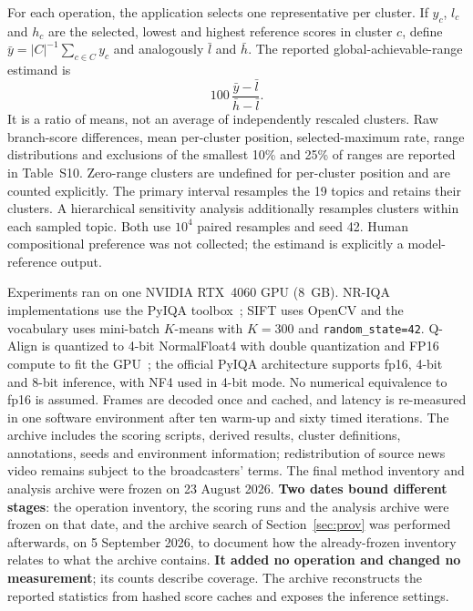 For each operation, the application selects one representative per cluster. If
$y_c$, $l_c$ and $h_c$ are the selected, lowest and highest reference scores in
cluster $c$, define $\bar y=|C|^{-1}\sum_{c\in C}y_c$ and analogously
$\bar l$ and $\bar h$. The reported global-achievable-range estimand is
\begin{equation}
100\,\frac{\bar y-\bar l}{\bar h-\bar l}.
\label{eq:globalrange}
\end{equation}
It is a ratio of means, not an average of independently rescaled clusters.
Raw branch-score differences, mean per-cluster position, selected-maximum rate,
range distributions and exclusions of the smallest 10\% and 25\% of ranges are
reported in Table~S10. Zero-range clusters are undefined for per-cluster
position and are counted explicitly. The primary interval resamples the 19
topics and retains their clusters. A hierarchical sensitivity analysis
additionally resamples clusters within each sampled topic. Both use $10^4$
paired resamples and seed 42. Human compositional preference was not collected;
the estimand is explicitly a model-reference output.

Experiments ran on one NVIDIA RTX~4060 GPU (8~GB). NR-IQA implementations use
the PyIQA toolbox~\citep{chen2022pyiqa}; SIFT uses OpenCV and the vocabulary uses
mini-batch $K$-means with $K=300$ and \texttt{random\_state=42}. Q-Align is
quantized to 4-bit NormalFloat4 with double quantization and FP16 compute to fit
the GPU~\citep{dettmers2023qlora}; the official PyIQA architecture supports
fp16, 4-bit and 8-bit inference, with NF4 used in 4-bit mode. No numerical
equivalence to fp16 is assumed. Frames
are decoded once and cached, and latency is re-measured in one software
environment after ten warm-up and sixty timed iterations. The archive includes
the scoring scripts, derived results, cluster definitions, annotations, seeds
and environment information; redistribution of source news video remains
subject to the broadcasters' terms. The final method inventory and analysis
archive were frozen on 23 August 2026. \textbf{Two dates bound different stages}: the operation
inventory, the scoring runs and the analysis archive were frozen on that date, and the
archive search of Section~\ref{sec:prov} was performed afterwards, on 5 September 2026, to
document how the already-frozen inventory relates to what the archive contains. \textbf{It
added no operation and changed no measurement}; its counts describe coverage. The archive reconstructs the reported statistics from
hashed score caches and exposes the inference settings.
